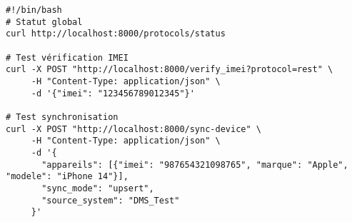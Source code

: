 \documentclass[11pt]{article}
\begin{document}
\begin{lstlisting}[caption=Script de test complet]
#!/bin/bash
# Statut global
curl http://localhost:8000/protocols/status

# Test vérification IMEI
curl -X POST "http://localhost:8000/verify_imei?protocol=rest" \
     -H "Content-Type: application/json" \
     -d '{"imei": "123456789012345"}'

# Test synchronisation
curl -X POST "http://localhost:8000/sync-device" \
     -H "Content-Type: application/json" \
     -d '{
       "appareils": [{"imei": "987654321098765", "marque": "Apple", "modele": "iPhone 14"}],
       "sync_mode": "upsert",
       "source_system": "DMS_Test"
     }'
\end{lstlisting}
\end{document}
